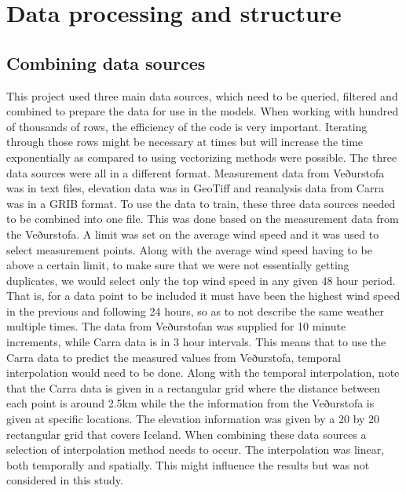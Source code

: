 \chapter{Data processing and structure} %

\label{Chapter3} %


\section{Combining data sources}

This project used three main data sources, which need to be queried, filtered and combined to prepare the data for use in the models. When working with hundred of thousands of rows, the efficiency of the code is very important. Iterating through those rows might be necessary at times but will increase the time exponentially as compared to using vectorizing methods were possible. The three data sources were all in a different format. Measurement data from Veðurstofa was in text files, elevation data was in GeoTiff and reanalysis data from Carra was in a GRIB format. To use the data to train, these three data sources needed to be combined into one file. This was done based on the measurement data from the Veðurstofa. A limit was set on the average wind speed and it was used to select measurement points. Along with the average wind speed having to be above a certain limit, to make sure that we were not essentially getting duplicates, we would select only the top wind speed in any given 48 hour period. That is, for a data point to be included it must have been the highest wind speed in the previous and following 24 hours, so as to not describe the same weather multiple times. The data from Veðurstofan was supplied for 10 minute increments, while Carra data is in 3 hour intervals. This means that to use the Carra data to predict the measured values from Veðurstofa, temporal interpolation would need to be done. Along with the temporal interpolation, note that the Carra data is given in a rectangular grid where the distance between each point is around 2.5km while the the information from the Veðurstofa is given at specific locations. The elevation information was given by a 20 by 20 rectangular grid that covers Iceland. When combining these data sources a selection of interpolation method needs to occur. The interpolation was linear, both temporally and spatially. This might influence the results but was not considered in this study.

